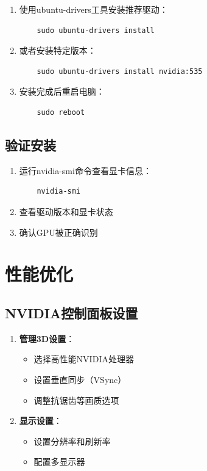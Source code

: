 \documentclass[12pt,UTF8]{ctexbook}
\begin{document}
\begin{enumerate}
    \item 使用ubuntu-drivers工具安装推荐驱动：
    \begin{verbatim}
    sudo ubuntu-drivers install
    \end{verbatim}
    
    \item 或者安装特定版本：
    \begin{verbatim}
    sudo ubuntu-drivers install nvidia:535
    \end{verbatim}
    
    \item 安装完成后重启电脑：
    \begin{verbatim}
    sudo reboot
    \end{verbatim}
\end{enumerate}

\section{验证安装}

\begin{enumerate}
    \item 运行nvidia-smi命令查看显卡信息：
    \begin{verbatim}
    nvidia-smi
    \end{verbatim}
    
    \item 查看驱动版本和显卡状态
    \item 确认GPU被正确识别
\end{enumerate}

\chapter{性能优化}

\section{NVIDIA控制面板设置}

\begin{enumerate}
    \item \textbf{管理3D设置}：
    \begin{itemize}[leftmargin=2em]
        \item 选择高性能NVIDIA处理器
        \item 设置垂直同步（VSync）
        \item 调整抗锯齿等画质选项
    \end{itemize}
    
    \item \textbf{显示设置}：
    \begin{itemize}[leftmargin=2em]
        \item 设置分辨率和刷新率
        \item 配置多显示器
    \end{itemize}
\end{enumerate}
\end{document}
